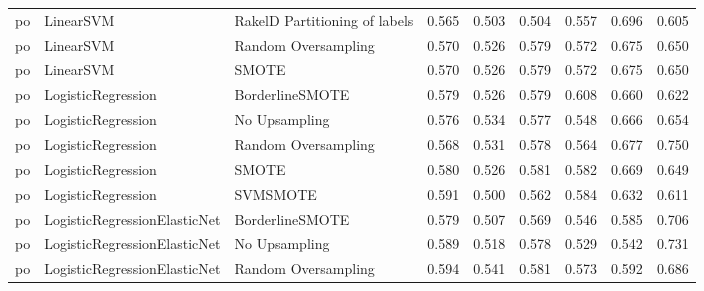 \begin{tabular}{lllllllll}
      po &                       LinearSVM & RakelD Partitioning of labels & 0.565 &                     0.503 &                 0.504 &                  0.557 &                                   0.696 &     0.605 \\
      po &                       LinearSVM &           Random Oversampling & 0.570 &                     0.526 &                 0.579 &                  0.572 &                                   0.675 &     0.650 \\
      po &                       LinearSVM &                         SMOTE & 0.570 &                     0.526 &                 0.579 &                  0.572 &                                   0.675 &     0.650 \\
      po &              LogisticRegression &               BorderlineSMOTE & 0.579 &                     0.526 &                 0.579 &                  0.608 &                                   0.660 &     0.622 \\
      po &              LogisticRegression &                 No Upsampling & 0.576 &                     0.534 &                 0.577 &                  0.548 &                                   0.666 &     0.654 \\
      po &              LogisticRegression &           Random Oversampling & 0.568 &                     0.531 &                 0.578 &                  0.564 &                                   0.677 &     0.750 \\
      po &              LogisticRegression &                         SMOTE & 0.580 &                     0.526 &                 0.581 &                  0.582 &                                   0.669 &     0.649 \\
      po &              LogisticRegression &                      SVMSMOTE & 0.591 &                     0.500 &                 0.562 &                  0.584 &                                   0.632 &     0.611 \\
      po &    LogisticRegressionElasticNet &               BorderlineSMOTE & 0.579 &                     0.507 &                 0.569 &                  0.546 &                                   0.585 &     0.706 \\
      po &    LogisticRegressionElasticNet &                 No Upsampling & 0.589 &                     0.518 &                 0.578 &                  0.529 &                                   0.542 &     0.731 \\
      po &    LogisticRegressionElasticNet &           Random Oversampling & 0.594 &                     0.541 &                 0.581 &                  0.573 &                                   0.592 &     0.686 \\

\end{tabular}
